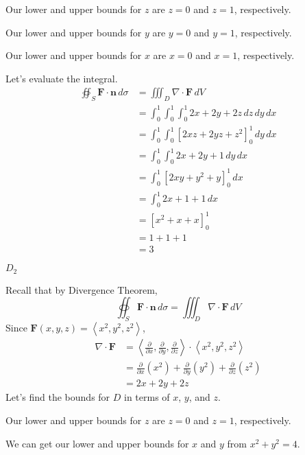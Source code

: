 \documentclass{article}
\newcommand{\lrp}[1]{\left( #1 \right)}
\newcommand{\lra}[1]{\left\langle #1 \right\rangle}
\newcommand{\lrb}[1]{\left[ #1 \right]}
\newcommand{\F}[0]{\mathbf{F}}
\newcommand{\n}[0]{{\mathbf{n}}}
\begin{document}
Our lower and upper bounds for $z$ are $z=0$ and $z=1$, respectively.

Our lower and upper bounds for $y$ are $y=0$ and $y=1$, respectively.

Our lower and upper bounds for $x$ are $x=0$ and $x=1$, respectively.

Let's evaluate the integral.
\begin{align*}
 \oiint_S \F\cdot \n \,d\sigma &=   \iiint_D \nabla \cdot \F\,dV\\
 &=  \int_0^1 \int_0^1 \int_0^1 2x+2y+2z\,dz\,dy\,dx\\
    &=\int_0^1\int_0^1 \lrb{2xz+2yz+z^2}_0^1 \,dy\,dx\\
    &=\int_0^1 \int_0^1 2x + 2y + 1\,dy\,dx\\
    &=\int_0^1 \lrb{2xy+y^2+y}_0^1 \,dx\\
    &=\int_0^1 2x+1+1\,dx\\
    &=\lrb{x^2+x+x}_0^1\\
    &=1+1+1\\
    &=3
\end{align*}

{} $D_2$

Recall that by Divergence Theorem,
\begin{equation*}
    \oiint_S \F\cdot \n \,d\sigma = \iiint_D \nabla \cdot \F\,dV
\end{equation*}
Since $\F(x,y,z)=\lra{x^2,y^2,z^2}$,
\begin{align*}
    \nabla \cdot \F&=\lra{\frac{\partial }{\partial x},\frac{\partial }{\partial y},\frac{\partial }{\partial z}}\cdot \lra{x^2,y^2,z^2}\\
    &=\frac{\partial}{\partial x}\lrp{x^2}+\frac{\partial}{\partial y}\lrp{y^2}+\frac{\partial}{\partial z}\lrp{z^2}\\
    &=2x+2y+2z
\end{align*}
Let's find the bounds for $D$ in terms of $x$, $y$, and $z$.

Our lower and upper bounds for $z$ are $z=0$ and $z=1$, respectively.

We can get our lower and upper bounds for $x$ and $y$ from $x^2+y^2=4$.
\end{document}
